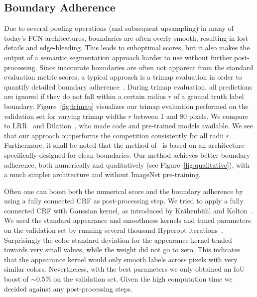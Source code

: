 \documentclass[10pt,twocolumn,letterpaper]{article}
\begin{document}
\subsection{Boundary Adherence}
\vspace*{-3pt}
Due to several pooling operations (and subsequent upsampling) in many of today's FCN architectures, boundaries are often overly smooth, resulting in lost details and edge-bleeding.
This leads to suboptimal scores, but it also makes the output of a semantic segmentation approach harder to use without further post-processing.
Since inaccurate boundaries are often not apparent from the standard evaluation metric scores, a typical approach is a trimap evaluation in order to quantify detailed boundary adherence~\cite{Kohli09IJCV,Krahenbuhl11NIPS,Ghiasi16ECCV}.
During trimap evaluation, all predictions are ignored if they do not fall within a certain radius $r$ of a ground truth label boundary.
Figure~\ref{fig:trimap} visualizes our trimap evaluation performed on the validation set for varying trimap widths $r$ between 1 and 80 pixels.
We compare to LRR~\cite{Ghiasi16ECCV} and Dilation~\cite{Yu16ICLR}, who made code and pre-trained models available.
We see that our approach outperforms the competition consistently for all radii $r$. 
Furthermore, it shall be noted that the method of~\cite{Ghiasi16ECCV} is based on an architecture specifically designed for clean boundaries.
Our method achieves better boundary adherence, both numerically and qualitatively (see Figure~\ref{fig:qualitative}), with a much simpler architecture and without ImageNet pre-training.

Often one can boost both the numerical score and the boundary adherence by using a fully connected CRF as post-processing step.
We tried to apply a fully connected CRF with Gaussian kernel, as introduced by Kr{\"{a}}henb{\"{u}}hl and Kolton~\cite{Krahenbuhl11NIPS}.
We used the standard appearance and smoothness kernels and tuned parameters on the validation set by running several thousand Hyperopt iterations~\cite{Bergstra13ICML}.
Surprisingly the color standard deviation for the appearance kernel tended towards very small values, while the weight did not go to zero.
This indicates that the appearance kernel would only smooth labels across pixels with very similar colors.
Nevertheless, with the best parameters we only obtained an IoU boost of $\sim0.5\%$ on the validation set.
Given the high computation time we decided against any post-processing steps.
\end{document}
